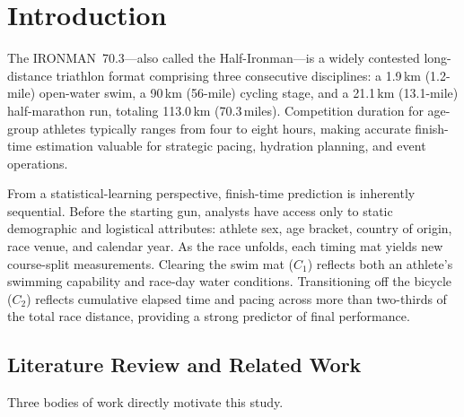 \documentclass[11pt,a4paper]{article}
\begin{document}
\section{Introduction}

The IRONMAN~70.3---also called the Half-Ironman---is a widely
contested long-distance triathlon format comprising three consecutive
disciplines: a 1.9\,km (1.2-mile) open-water swim, a 90\,km (56-mile)
cycling stage, and a 21.1\,km (13.1-mile) half-marathon run, totaling
113.0\,km (70.3\,miles). Competition duration for age-group athletes
typically ranges from four to eight hours, making accurate finish-time
estimation valuable for strategic pacing, hydration planning, and
event operations.

From a statistical-learning perspective, finish-time prediction is
inherently sequential. Before the starting gun, analysts have access
only to static demographic and logistical attributes: athlete sex, age
bracket, country of origin, race venue, and calendar year. As the race
unfolds, each timing mat yields new course-split measurements.
Clearing the swim mat ($C_1$) reflects both an athlete's swimming
capability and race-day water conditions. Transitioning off the
bicycle ($C_2$) reflects cumulative elapsed time and pacing across
more than two-thirds of the total race distance, providing a strong
predictor of final performance.

\subsection{Literature Review and Related Work}

Three bodies of work directly motivate this study.
\end{document}
